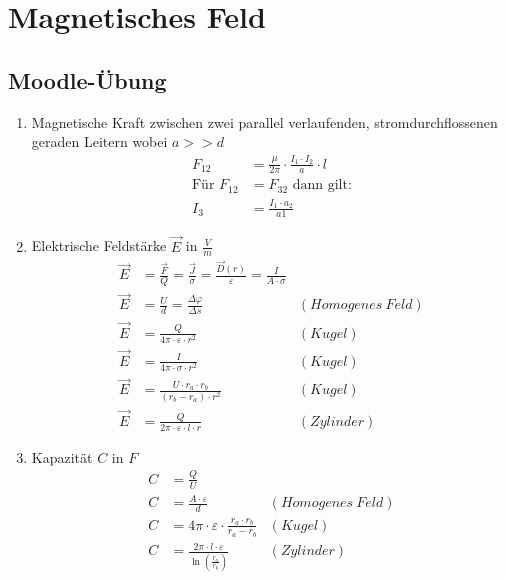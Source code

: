 \section{Magnetisches Feld}
\subsection{Moodle-Übung}
\begin{enumerate}
  \item Magnetische Kraft zwischen zwei parallel verlaufenden, stromdurchflossenen geraden Leitern wobei $a >> d$
    \begin{align*}
      F_{12}&= \frac{\mu}{2\pi}\cdot \frac{I_1\cdot I_2}{a}\cdot l\\
      \text{Für } F_{12} &= F_{32} \text{ dann gilt:}\\
      I_3 &= \frac{I_1\cdot a_2}{a1}
    \end{align*}
    \item Elektrische Feldstärke $ \vec E $ in $ \frac{V}{m} $
        \begin{align*}
            \vec E&= \frac{\vec F}{Q} = \frac{\vec J}{\sigma}= \frac{\vec D(r)}{\varepsilon}=\frac{I}{A\cdot \sigma} \\
            \vec E&= \frac{U}{d}=\frac{\Delta\varphi}{\Delta s} &(Homogenes \ Feld)\\ 
            \vec E&= \frac{Q}{4\pi\cdot\varepsilon\cdot r^2} &(Kugel) \\ 
            \vec E&= \frac{I}{4\pi\cdot\sigma\cdot r^2} &(Kugel) \\ 
            \vec E&= \frac{U\cdot r_a\cdot r_b}{(r_b-r_a)\cdot r^2} &(Kugel) \\ 
            \vec E&= \frac{Q}{2\pi\cdot\varepsilon\cdot l\cdot r} &(Zylinder)
        \end{align*}
  \item Kapazität $ C $ in $ F $
    \begin{align*}
        C&=\frac{Q}{U}\\
        C&=\frac{A\cdot\varepsilon}{d} &(Homogenes \ Feld)\\ 
        C&=4\pi\cdot\varepsilon\cdot \frac{r_a\cdot r_b}{r_a-r_b} &(Kugel)\\ 
        C&=\frac{2\pi\cdot l\cdot\varepsilon}{\ln\left(\frac{r_a}{r_b}\right)} &(Zylinder)
    \end{align*}
\end{enumerate}
